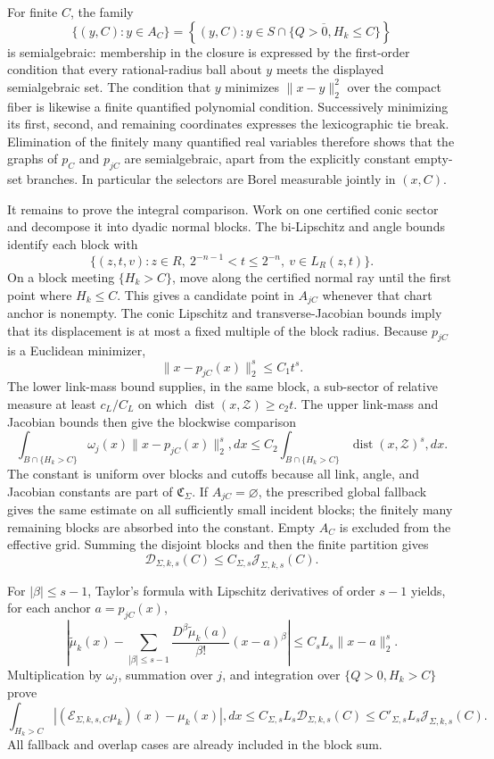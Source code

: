 For finite \(C\), the family
\[
\{(y,C):y\in A_C\}
=\left\{(y,C):y\in\overline{S\cap\{Q>0,H_k\le C\}}\right\}
\]
is semialgebraic: membership in the closure is expressed by the first-order condition that every rational-radius ball about \(y\) meets the displayed semialgebraic set. The condition that \(y\) minimizes \(\|x-y\|_2^2\) over the compact fiber is likewise a finite quantified polynomial condition. Successively minimizing its first, second, and remaining coordinates expresses the lexicographic tie break. Elimination of the finitely many quantified real variables therefore shows that the graphs of \(p_C\) and \(p_{jC}\) are semialgebraic, apart from the explicitly constant empty-set branches. In particular the selectors are Borel measurable jointly in \((x,C)\).

It remains to prove the integral comparison. Work on one certified conic sector and decompose it into dyadic normal blocks. The bi-Lipschitz and angle bounds identify each block with
\[
\{(z,t,v):z\in R,\ 2^{-n-1}<t\le2^{-n},\ v\in L_R(z,t)\}.
\]
On a block meeting \(\{H_k>C\}\), move along the certified normal ray until the first point where \(H_k\le C\). This gives a candidate point in \(A_{jC}\) whenever that chart anchor is nonempty. The conic Lipschitz and transverse-Jacobian bounds imply that its displacement is at most a fixed multiple of the block radius. Because \(p_{jC}\) is a Euclidean minimizer,
\[
\|x-p_{jC}(x)\|_2^s\le C_1t^s.
\]
The lower link-mass bound supplies, in the same block, a sub-sector of relative measure at least \(c_L/C_L\) on which \(\operatorname{dist}(x,\mathcal Z)\ge c_2t\). The upper link-mass and Jacobian bounds then give the blockwise comparison
\[
\int_{B\cap\{H_k>C\}}\omega_j(x)\|x-p_{jC}(x)\|_2^s,dx
\le C_2\int_{B\cap\{H_k>C\}}\operatorname{dist}(x,\mathcal Z)^s,dx.
\]
The constant is uniform over blocks and cutoffs because all link, angle, and Jacobian constants are part of \(\mathfrak C_\Sigma\). If \(A_{jC}=\varnothing\), the prescribed global fallback gives the same estimate on all sufficiently small incident blocks; the finitely many remaining blocks are absorbed into the constant. Empty \(A_C\) is excluded from the effective grid. Summing the disjoint blocks and then the finite partition gives
\[
\mathcal D_{\Sigma,k,s}(C)\le C_{\Sigma,s}\mathcal J_{\Sigma,k,s}(C).
\]

For \(|\beta|\le s-1\), Taylor's formula with Lipschitz derivatives of order \(s-1\) yields, for each anchor \(a=p_{jC}(x)\),
\[
\left|\widetilde\mu_k(x)-
\sum_{|\beta|\le s-1}
\frac{D^\beta\widetilde\mu_k(a)}{\beta!}(x-a)^\beta\right|
\le C_sL_s\|x-a\|_2^s.
\]
Multiplication by \(\omega_j\), summation over \(j\), and integration over \(\{Q>0,H_k>C\}\) prove
\[
\int_{H_k>C}|(\mathcal E_{\Sigma,k,s,C}\mu_k)(x)-\mu_k(x)|,dx
\le C_{\Sigma,s}L_s\mathcal D_{\Sigma,k,s}(C)
\le C'_{\Sigma,s}L_s\mathcal J_{\Sigma,k,s}(C).
\]
All fallback and overlap cases are already included in the block sum.